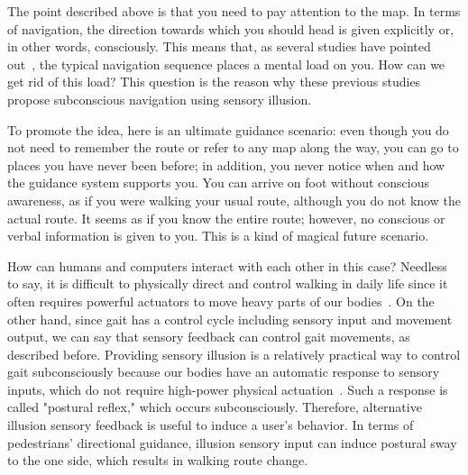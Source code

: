 \documentclass{sigchi}
\begin{document}
The point described above is that you need to pay attention to the map. In terms of navigation, the direction towards which you should head is given explicitly or, in other words, consciously. This means that, as several studies have pointed out~\cite{Ghaem1997,PSYP:PSYP1043,1276842},
 the typical navigation sequence places a mental load on you. How can we get rid of this load? This question is the reason why these previous studies propose subconscious navigation using sensory illusion\cite{Tanikawa2012,%
TJP:TJP931,TJP:TJP1033,7460029,7989977,BENT2000157,Britton1993}.%

To promote the idea, here is an ultimate guidance scenario: even though you do not need to remember the route or refer to any map along the way, you can go to places you have never been before; in addition, you never notice when and how the guidance system supports you. You can arrive on foot without conscious awareness, as if you were walking your usual route, although you do not know the actual route. It seems as if you know the entire route; however, no conscious or verbal information is given to you. This is a kind of magical future scenario.

How can humans and computers interact with each other in this case? Needless to say, it is difficult to physically direct and control walking in daily life since it often requires powerful actuators to move heavy parts of our bodies~\cite{doi:10.3109/03093648709078194,DOMINGO2009464}. On the other hand, since gait has a control cycle including sensory input and movement output, we can say that sensory feedback can control gait movements, as described before. Providing sensory illusion is a relatively practical way to control gait subconsciously because our bodies have an automatic response to sensory inputs, which do not require high-power physical actuation~\cite{Watanabe2010,Watanabe:2005:SII:1152399.1152406,Jones2008,Imamura:2011:HHW:2048259.2048265, Turchet2015, 7460029}. Such a response is called "postural reflex," which occurs subconsciously. Therefore, alternative illusion sensory feedback is useful to induce a user's behavior. In terms of pedestrians' directional guidance, illusion sensory input\cite{JPR:JPR167,pmid7845766,pmid25774143,Furukawa:2011:VFP:1959826.1959845} can induce postural sway to the one side, which results in walking route change. 
\end{document}
